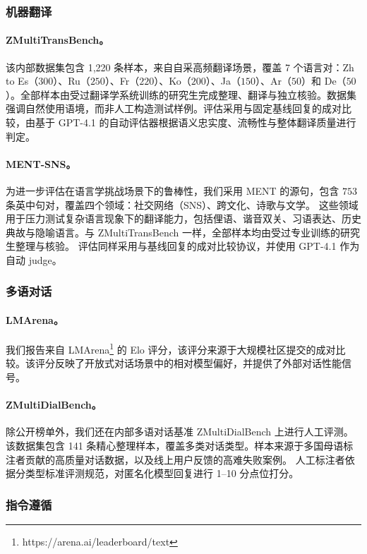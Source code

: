 \subsubsection{机器翻译}

\paragraph{ZMultiTransBench。}
该内部数据集包含 1,220 条样本，来自自采高频翻译场景，覆盖 7 个语言对：Zh to Es（\(300\)）、Ru（\(250\)）、Fr（\(220\)）、Ko（\(200\)）、Ja（\(150\)）、Ar（\(50\)）和 De（\(50\)）。全部样本由受过翻译学系统训练的研究生完成整理、翻译与独立核验。数据集强调自然使用语境，而非人工构造测试样例。评估采用与固定基线回复的成对比较，由基于 GPT-4.1 的自动评估器根据语义忠实度、流畅性与整体翻译质量进行判定。


\paragraph{MENT-SNS。}
为进一步评估在语言学挑战场景下的鲁棒性，我们采用 MENT \citep{tian2026ment} 的源句，包含 \(753\) 条英中句对，覆盖四个领域：社交网络（SNS）、跨文化、诗歌与文学。
这些领域用于压力测试复杂语言现象下的翻译能力，包括俚语、谐音双关、习语表达、历史典故与隐喻语言。与 ZMultiTransBench 一样，全部样本均由受过专业训练的研究生整理与核验。
评估同样采用与基线回复的成对比较协议，并使用 GPT-4.1 作为自动 judge。

\subsubsection{多语对话}
\paragraph{LMArena。}
我们报告来自 LMArena\footnote{https://arena.ai/leaderboard/text}
 的 Elo 评分，该评分来源于大规模社区提交的成对比较。该评分反映了开放式对话场景中的相对模型偏好，并提供了外部对话性能信号。

\paragraph{ZMultiDialBench。}
除公开榜单外，我们还在内部多语对话基准 ZMultiDialBench 上进行人工评测。该数据集包含 141 条精心整理样本，覆盖多类对话类型。样本来源于多国母语标注者贡献的高质量对话数据，以及线上用户反馈的高难失败案例。
人工标注者依据分类型标准评测规范，对匿名化模型回复进行 1–10 分点位打分。

\subsubsection{指令遵循}
